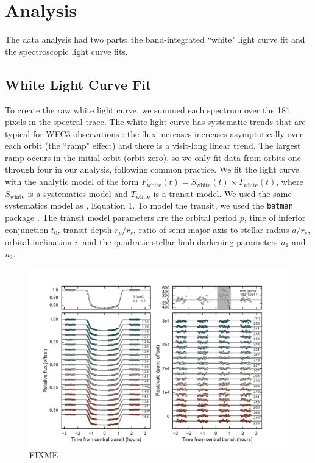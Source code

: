 \documentclass[twocolumn]{aastex61}
\begin{document}
\section{Analysis}
The data analysis had two parts: the band-integrated ``white" light curve fit and the spectroscopic light curve fits.

\subsection{White Light Curve Fit}
To create the raw white light curve, we summed each spectrum over the 181 pixels in the spectral trace.  The white light curve has systematic trends that are typical for WFC3 observations \citep{zhou17}: the flux increases increases asymptotically over each orbit (the ``ramp" effect) and there is a visit-long linear trend. The largest ramp occurs in the initial orbit (orbit zero), so we only fit data from orbits one through four in our analysis, following common practice.  We fit the light curve with the analytic model of the form $F_\mathrm{white}(t) = S_\mathrm{white}(t)\times T_\mathrm{white}(t)$, where $S_\mathrm{white}$ is a systematics model and $T_\mathrm{white}$ is a transit model. We used the same systematics model as \cite{kreidberg15b}, Equation 1.  To model the transit, we used the \texttt{batman} package \citep{kreidberg15a}.  The transit model parameters are the orbital period $p$, time of inferior conjunction $t_0$, transit depth $r_p/r_s$, ratio of semi-major axis to stellar radius $a/r_s$, orbital inclination $i$, and the quadratic stellar limb darkening parameters $u_1$ and $u_2$.

\begin{figure}
\includegraphics[width = \textwidth]{Figures/lc.pdf}
\caption{FIXME}
\label{fig:lc}
\end{figure}
\end{document}
